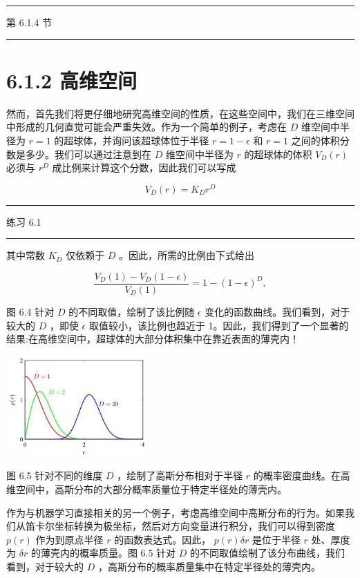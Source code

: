 \documentclass[10pt]{article}
\newcommand{\HRule}{\begin{center}\rule{0.9\linewidth}{0.2mm}\end{center}}
\begin{document}
\HRule

第 6.1.4 节

\HRule

\section*{6.1.2 高维空间}

然而，首先我们将更仔细地研究高维空间的性质，在这些空间中，我们在三维空间中形成的几何直觉可能会严重失效。作为一个简单的例子，考虑在 \(D\) 维空间中半径为 \(r = 1\) 的超球体，并询问该超球体位于半径 \(r = 1 - \epsilon\) 和 \(r = 1\) 之间的体积分数是多少。我们可以通过注意到在 \(D\) 维空间中半径为 \(r\) 的超球体的体积 \({V}_{D}\left( r\right)\) 必须与 \({r}^{D}\) 成比例来计算这个分数，因此我们可以写成

\[
{V}_{D}\left( r\right)  = {K}_{D}{r}^{D} \tag{6.4}
\]

\HRule

练习 6.1

\HRule

其中常数 \({K}_{D}\) 仅依赖于 \(D\) 。因此，所需的比例由下式给出

\[
\frac{{V}_{D}\left( 1\right)  - {V}_{D}\left( {1 - \epsilon }\right) }{{V}_{D}\left( 1\right) } = 1 - {\left( 1 - \epsilon \right) }^{D}, \tag{6.5}
\]

图 6.4 针对 \(D\) 的不同取值，绘制了该比例随 \(\epsilon\) 变化的函数曲线。我们看到，对于较大的 \(D\) ，即使 \(\epsilon\) 取值较小，该比例也趋近于 1。因此，我们得到了一个显著的结果:在高维空间中，超球体的大部分体积集中在靠近表面的薄壳内！

\begin{center}
\includegraphics[max width=0.4\textwidth]{images/0194e279-9b28-703a-88f4-c3ac21e2010d_195_938_347_613_444_0.jpg}
\end{center}
\hspace*{3em} 

图 6.5 针对不同的维度 \(D\) ，绘制了高斯分布相对于半径 \(r\) 的概率密度曲线。在高维空间中，高斯分布的大部分概率质量位于特定半径处的薄壳内。

作为与机器学习直接相关的另一个例子，考虑高维空间中高斯分布的行为。如果我们从笛卡尔坐标转换为极坐标，然后对方向变量进行积分，我们可以得到密度 \(p\left( r\right)\) 作为到原点半径 \(r\) 的函数表达式。因此， \(p\left( r\right) {\delta r}\) 是位于半径 \(r\) 处、厚度为 \({\delta r}\) 的薄壳内的概率质量。图 6.5 针对 \(D\) 的不同取值绘制了该分布曲线，我们看到，对于较大的 \(D\) ，高斯分布的概率质量集中在特定半径处的薄壳内。
\end{document}
